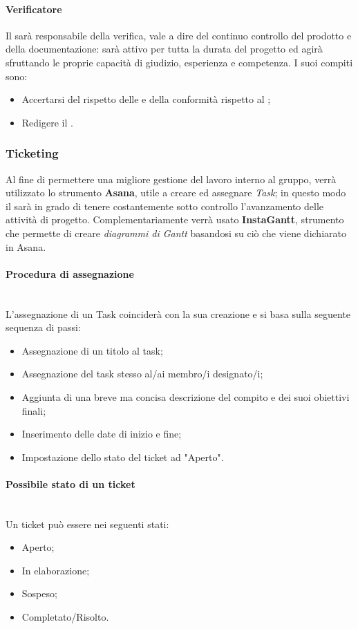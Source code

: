 \paragraph{Verificatore} \label{verificatore}
Il \ver{} sarà responsabile della verifica, vale a dire del continuo controllo del prodotto e della documentazione: sarà attivo per tutta la durata del progetto ed agirà sfruttando le proprie capacità di giudizio, esperienza e competenza. I suoi compiti sono:
\begin{itemize}
\item Accertarsi del rispetto delle \NdP{} e della conformità rispetto al \PdQ{};
\item Redigere il \PdQ{}.
\end{itemize}

\subsubsection{Ticketing}
Al fine di permettere una migliore gestione del lavoro interno al gruppo, verrà utilizzato lo strumento \textbf{Asana}, utile a creare ed assegnare \emph{Task}; in questo modo il \RdP  sarà in grado di tenere costantemente sotto controllo l'avanzamento delle attività di progetto. Complementariamente verrà usato \textbf{InstaGantt}, strumento che permette di creare \emph{diagrammi di Gantt} basandosi su ciò che viene dichiarato in Asana.
\paragraph{Procedura di assegnazione}
~\\L'assegnazione di un Task coinciderà con la sua creazione e si basa sulla seguente sequenza di passi:
\begin{itemize}
\item Assegnazione di un titolo al task;
\item Assegnazione del task stesso al/ai membro/i designato/i;
\item Aggiunta di una breve ma concisa descrizione del compito e dei suoi obiettivi finali;
\item Inserimento delle date di inizio e fine;
\item Impostazione dello stato del ticket ad "Aperto".
\end{itemize}

\paragraph{Possibile stato di un ticket}
~\\Un ticket può essere nei seguenti stati:
\begin{itemize}
\item Aperto;
\item In elaborazione;
\item Sospeso;
\item Completato/Risolto.
\end{itemize}

